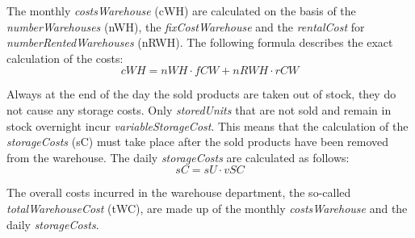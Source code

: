 The monthly \textit{costsWarehouse} (\gls{cWH}) are calculated on the basis of the \textit{numberWarehouses} (\gls{nWH}), the \textit{fixCostWarehouse} and the \textit{rentalCost} for \textit{numberRentedWarehouses} (\gls{nRWH}). The following formula describes the exact calculation of the costs:
\begin{equation}
\label{func:cWH} %
     cWH = nWH \cdot fCW + nRWH \cdot rCW
\end{equation}

Always at the end of the day the sold products are taken out of stock, they do not cause any storage costs. Only \textit{storedUnits} that are not sold and remain in stock overnight incur \textit{variableStorageCost}. This means that the calculation of the \textit{storageCosts} (\gls{sC}) must take place after the sold products have been removed from the warehouse. The daily \textit{storageCosts} are calculated as follows:
\begin{equation}
\label{func:SC} %
    sC = sU \cdot vSC
\end{equation}

The overall costs incurred in the warehouse department, the so-called \textit{totalWarehouseCost} (\gls{tWC}), are made up of the monthly \textit{costsWarehouse} and the daily \textit{storageCosts}. 